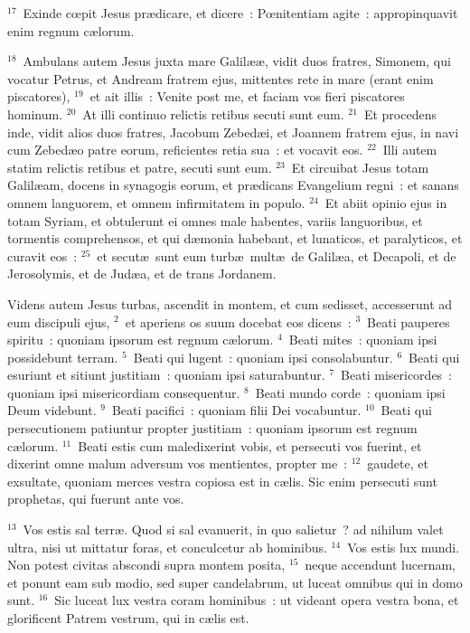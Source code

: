 ${}^{17}$~Exinde cœpit Jesus pr\ae dicare, et dicere~: Pœnitentiam agite~: appropinquavit enim regnum c\ae lorum.


${}^{18}$~Ambulans autem Jesus juxta mare Galil\ae \ae , vidit duos fratres, Simonem, qui vocatur Petrus, et Andream fratrem ejus, mittentes rete in mare (erant enim piscatores),
${}^{19}$~et ait illis~: Venite post me, et faciam vos fieri piscatores hominum.
${}^{20}$~At illi continuo relictis retibus secuti sunt eum.
${}^{21}$~Et procedens inde, vidit alios duos fratres, Jacobum Zebed\ae i, et Joannem fratrem ejus, in navi cum Zebed\ae o patre eorum, reficientes retia sua~: et vocavit eos.
${}^{22}$~Illi autem statim relictis retibus et patre, secuti sunt eum.
${}^{23}$~Et circuibat Jesus totam Galil\ae am, docens in synagogis eorum, et pr\ae dicans Evangelium regni~: et sanans omnem languorem, et omnem infirmitatem in populo.
${}^{24}$~Et abiit opinio ejus in totam Syriam, et obtulerunt ei omnes male habentes, variis languoribus, et tormentis comprehensos, et qui d\ae monia habebant, et lunaticos, et paralyticos, et curavit eos~:
${}^{25}$~et secut\ae\ sunt eum turb\ae\ mult\ae\ de Galil\ae a, et Decapoli, et de Jerosolymis, et de Jud\ae a, et de trans Jordanem.

\lettrine[lines=10,image=true,loversize=0.05,lraise=-0.03]{V}{}idens autem Jesus turbas, ascendit in montem, et cum sedisset, accesserunt ad eum discipuli ejus,
${}^{2}$~et aperiens os suum docebat eos dicens~:
${}^{3}$~Beati pauperes spiritu~: quoniam ipsorum est regnum c\ae lorum.
${}^{4}$~Beati mites~: quoniam ipsi possidebunt terram.
${}^{5}$~Beati qui lugent~: quoniam ipsi consolabuntur.
${}^{6}$~Beati qui esuriunt et sitiunt justitiam~: quoniam ipsi saturabuntur.
${}^{7}$~Beati misericordes~: quoniam ipsi misericordiam consequentur.
${}^{8}$~Beati mundo corde~: quoniam ipsi Deum videbunt.
${}^{9}$~Beati pacifici~: quoniam filii Dei vocabuntur.
${}^{10}$~Beati qui persecutionem patiuntur propter justitiam~: quoniam ipsorum est regnum c\ae lorum.
${}^{11}$~Beati estis cum maledixerint vobis, et persecuti vos fuerint, et dixerint omne malum adversum vos mentientes, propter me~:
${}^{12}$~gaudete, et exsultate, quoniam merces vestra copiosa est in c\ae lis. Sic enim persecuti sunt prophetas, qui fuerunt ante vos.


${}^{13}$~Vos estis sal terr\ae . Quod si sal evanuerit, in quo salietur~? ad nihilum valet ultra, nisi ut mittatur foras, et conculcetur ab hominibus.
${}^{14}$~Vos estis lux mundi. Non potest civitas abscondi supra montem posita,
${}^{15}$~neque accendunt lucernam, et ponunt eam sub modio, sed super candelabrum, ut luceat omnibus qui in domo sunt.
${}^{16}$~Sic luceat lux vestra coram hominibus~: ut videant opera vestra bona, et glorificent Patrem vestrum, qui in c\ae lis est.


